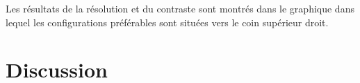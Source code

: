\documentclass[conference]{IEEEtran}
\begin{document}

Les résultats de la résolution et du contraste sont montrés dans le graphique 
\cite{rés-con} dans lequel les configurations préférables sont situées vers le 
coin supérieur droit. 


\section{Discussion}
\clearpage

% 
% 
\end{document}
